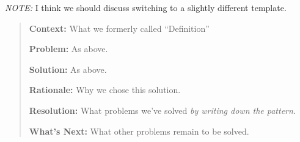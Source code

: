 \emph{NOTE:} I think we should discuss switching to a slightly
different template.

\begin{quote}
\textbf{Context:} What we formerly called ``Definition''

\textbf{Problem:} As above.

\textbf{Solution:} As above.

\textbf{Rationale:} Why we chose this solution.

\textbf{Resolution:} What problems we've solved \emph{by writing down the pattern}.

\textbf{What's Next:} What other problems remain to be solved.
\end{quote}
